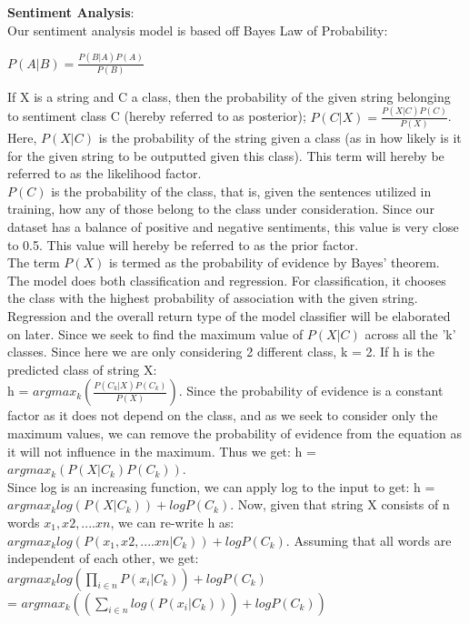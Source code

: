 \documentclass[fontsize=11pt]{article}
\begin{document}
\textbf{Sentiment Analysis}: \\
Our sentiment analysis model is based off Bayes Law of Probability: \\
\begin{center}
    $P(A|B) = \frac{P(B|A)P(A)}{P(B)}$
\end{center}
If X is a string and C a class, then the probability of the given string belonging to sentiment class C (hereby referred to as posterior); $P(C|X) = \frac{P(X|C)P(C)}{P(X)}$.\\
Here, $P(X|C)$ is the probability of the string given a class (as in how likely is it for the given string to be outputted given this class). This term will hereby be referred to as the likelihood factor.\\
$P(C)$ is the probability of the class, that is, given the sentences utilized in training, how any of those belong to the class under consideration. Since our dataset has a balance of positive and negative sentiments, this value is very close to 0.5. This value will hereby be referred to as the prior factor.
\\The term $P(X)$ is termed as the probability of evidence by Bayes' theorem.
\\The model does both classification and regression. For classification, it chooses the class with the highest probability of association with the given string. Regression and the overall return type of the model classifier will be elaborated on later.
Since we seek to find the maximum value of $P(X|C)$ across all the 'k' classes. Since here we are only considering 2 different class, k = 2. If h is the predicted class of string X:\\
h = $argmax_{k}(\frac{P(C_{k}|X)P(C_{k})}{P(X)})$. Since the probability of evidence is a constant factor as it does not depend on the class, and as we seek to consider only the maximum values, we can remove the probability of evidence from the equation as it will not influence in the maximum. Thus we get: h = $argmax_{k}(P(X|C_{k})P(C_{k}))$.\\
Since log is an increasing function, we can apply log to the input to get: h = $argmax_{k}log(P(X|C_{k})) 
+ logP(C_{k})$. Now, given that string X consists of n words $x_{1}, x{2},....x{n}$, we can re-write h as: $argmax_{k}log(P(x_{1}, x{2},....x{n}|C_{k})) + logP(C_{k})$. Assuming that all words are independent of each other, we get:\\ $argmax_{k}log(\prod_{i\in n}P(x_{i}|C_{k})) + logP(C_{k})$\\
= $argmax_{k}((\sum_{i\in n}log(P(x_{i}|C_{k}))) + logP(C_{k}))$\\
\end{document}
